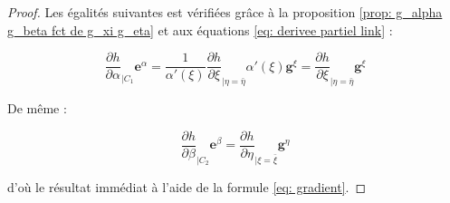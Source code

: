 \begin{proof}
Les égalités suivantes est vérifiées grâce à la proposition \ref{prop: g_alpha g_beta fct de g_xi g_eta} et aux équations \eqref{eq: derivee partiel link} :

\begin{equation}
\dfrac{\partial h}{\partial \alpha}_{|C_1} \mathbf{e}^{\alpha} = \dfrac{1}{\alpha'(\xi)} \dfrac{\partial h}{\partial \xi}_{|\eta = \bar{\eta}} \alpha'(\xi) \mathbf{g}^{\xi} = \dfrac{\partial h}{\partial \xi}_{|\eta = \bar{\eta}} \mathbf{g}^{\xi}
\end{equation}

De même :

\begin{equation}
\dfrac{\partial h}{\partial \beta}_{|C_2} \mathbf{e}^{\beta} =  \dfrac{\partial h}{\partial \eta}_{|\xi = \bar{\xi}} \mathbf{g}^{\eta}
\end{equation}

d'où le résultat immédiat à l'aide de la formule \eqref{eq: gradient}.
\end{proof}









